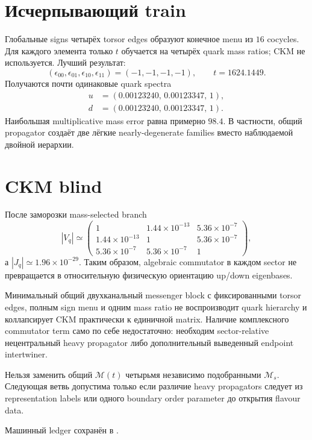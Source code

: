 \section{Исчерпывающий train}

Глобальные signs четырёх torsor edges образуют конечное menu из \(16\)
cocycles. Для каждого элемента только \(t\) обучается на четырёх quark mass
ratios; CKM не используется. Лучший результат:
\begin{equation}
 (\epsilon_{00},\epsilon_{01},\epsilon_{10},\epsilon_{11})
 =(-1,-1,-1,-1),
 \qquad t=1624.1449.
\end{equation}
Получаются почти одинаковые quark spectra
\begin{align}
 u&=(0.00123240,\,0.00123347,\,1),\\
 d&=(0.00123240,\,0.00123347,\,1).
\end{align}
Наибольшая multiplicative mass error равна примерно \(98.4\). В частности,
общий propagator создаёт две лёгкие nearly-degenerate families вместо
наблюдаемой двойной иерархии.

\section{CKM blind}

После заморозки mass-selected branch
\begin{equation}
 |V_q|\simeq
 \begin{pmatrix}
 1&1.44\times10^{-13}&5.36\times10^{-7}\\
 1.44\times10^{-13}&1&5.36\times10^{-7}\\
 5.36\times10^{-7}&5.36\times10^{-7}&1
 \end{pmatrix},
\end{equation}
а \(|J_q|\simeq1.96\times10^{-29}\). Таким образом, algebraic
commutator в каждом sector не превращается в относительную физическую
ориентацию up/down eigenbases.

\begin{theorem}
Минимальный общий двухканальный messenger block с фиксированными torsor edges,
полным sign menu и одним mass ratio не воспроизводит quark hierarchy и
коллапсирует CKM практически к единичной matrix. Наличие комплексного
commutator term само по себе недостаточно: необходим sector-relative
нецентральный heavy propagator либо дополнительный выведенный endpoint
intertwiner.
\end{theorem}

\begin{nogocriterion}
Нельзя заменить общий \(\mathcal M(t)\) четырьмя независимо подобранными
\(\mathcal M_s\). Следующая ветвь допустима только если различие heavy
propagators следует из representation labels или одного boundary order
parameter до открытия flavour data.
\end{nogocriterion}

Машинный ledger сохранён в
.